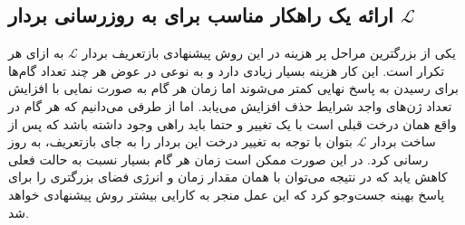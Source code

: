 \subsection{ ارائه یک راهکار مناسب برای به روزرسانی بردار $\mathcal{L}$}
یکی از بزرگترین مراحل پر هزینه در این روش پیشنهادی بازتعریف بردار $\mathcal{L}$ به ازای هر تکرار است. این کار هزینه بسیار زیادی دارد و به نوعی در عوض هر چند تعداد گام‌ها برای رسیدن به پاسخ نهایی کمتر می‌شوند اما زمان هر گام به صورت نمایی با افزایش تعداد ژن‌های واجد شرایط حذف افزایش می‌یابد. اما از طرفی می‌دانیم که هر گام در واقع همان درخت قبلی است با یک تغییر و حتما باید راهی وجود داشته باشد که پس از ساخت بردار $\mathcal{L}$ بتوان با توجه به تغییر درخت این بردار را به جای بازتعریف، به روز رسانی کرد. در این صورت ممکن است زمان هر گام بسیار نسبت به حالت فعلی کاهش یابد که در نتیجه می‌توان با همان مقدار زمان و انرژی فضای بزرگتری را برای پاسخ بهینه جست‌وجو کرد که این عمل منجر به کارایی بیشتر روش پیشنهادی خواهد شد.
